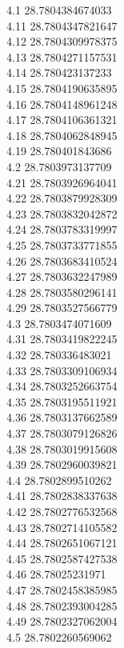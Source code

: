 {4.1	28.7804384674033\\
4.11	28.7804347821647\\
4.12	28.7804309978375\\
4.13	28.7804271157531\\
4.14	28.780423137233\\
4.15	28.7804190635895\\
4.16	28.7804148961248\\
4.17	28.7804106361321\\
4.18	28.7804062848945\\
4.19	28.780401843686\\
4.2	28.7803973137709\\
4.21	28.7803926964041\\
4.22	28.7803879928309\\
4.23	28.7803832042872\\
4.24	28.7803783319997\\
4.25	28.7803733771855\\
4.26	28.7803683410524\\
4.27	28.7803632247989\\
4.28	28.7803580296141\\
4.29	28.7803527566779\\
4.3	28.7803474071609\\
4.31	28.7803419822245\\
4.32	28.780336483021\\
4.33	28.7803309106934\\
4.34	28.7803252663754\\
4.35	28.7803195511921\\
4.36	28.7803137662589\\
4.37	28.7803079126826\\
4.38	28.7803019915608\\
4.39	28.7802960039821\\
4.4	28.7802899510262\\
4.41	28.7802838337638\\
4.42	28.7802776532568\\
4.43	28.7802714105582\\
4.44	28.7802651067121\\
4.45	28.7802587427538\\
4.46	28.78025231971\\
4.47	28.7802458385985\\
4.48	28.7802393004285\\
4.49	28.7802327062004\\
4.5	28.7802260569062\\
}

